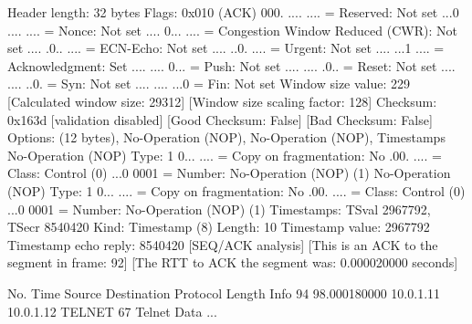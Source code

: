     Header length: 32 bytes
    Flags: 0x010 (ACK)
        000. .... .... = Reserved: Not set
        ...0 .... .... = Nonce: Not set
        .... 0... .... = Congestion Window Reduced (CWR): Not set
        .... .0.. .... = ECN-Echo: Not set
        .... ..0. .... = Urgent: Not set
        .... ...1 .... = Acknowledgment: Set
        .... .... 0... = Push: Not set
        .... .... .0.. = Reset: Not set
        .... .... ..0. = Syn: Not set
        .... .... ...0 = Fin: Not set
    Window size value: 229
    [Calculated window size: 29312]
    [Window size scaling factor: 128]
    Checksum: 0x163d [validation disabled]
        [Good Checksum: False]
        [Bad Checksum: False]
    Options: (12 bytes), No-Operation (NOP), No-Operation (NOP), Timestamps
        No-Operation (NOP)
            Type: 1
                0... .... = Copy on fragmentation: No
                .00. .... = Class: Control (0)
                ...0 0001 = Number: No-Operation (NOP) (1)
        No-Operation (NOP)
            Type: 1
                0... .... = Copy on fragmentation: No
                .00. .... = Class: Control (0)
                ...0 0001 = Number: No-Operation (NOP) (1)
        Timestamps: TSval 2967792, TSecr 8540420
            Kind: Timestamp (8)
            Length: 10
            Timestamp value: 2967792
            Timestamp echo reply: 8540420
    [SEQ/ACK analysis]
        [This is an ACK to the segment in frame: 92]
        [The RTT to ACK the segment was: 0.000020000 seconds]

No.     Time           Source                Destination           Protocol Length Info
     94 98.000180000   10.0.1.11             10.0.1.12             TELNET   67     Telnet Data ...

